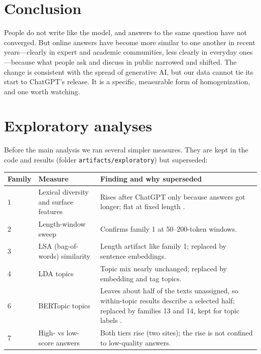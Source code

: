\documentclass[11pt]{article}
\begin{document}
\section{Conclusion}

People do not write like the model, and answers to the same question have not converged. But online
answers have become more similar to one another in recent years---clearly in expert and academic
communities, less clearly in everyday ones---because what people ask and discuss in public narrowed
and shifted. The change is consistent with the spread of generative AI, but our data cannot tie its
start to ChatGPT's release. It is a specific, measurable form of homogenization, and one worth
watching.

\appendix
\section{Exploratory analyses}
\label{app:exploratory}

Before the main analysis we ran several simpler measures. They are kept in the code and results
(folder \texttt{artifacts/\allowbreak exploratory}) but superseded:

\begin{table}[H]
\centering
\small
\begin{tabularx}{\linewidth}{lp{3.2cm}X}
\toprule
Family & Measure & Finding and why superseded \\
\midrule
1 & Lexical diversity and surface features & Rises after ChatGPT only because answers got longer; flat at fixed length \citep{mccarthy2010}. \\
2 & Length-window sweep & Confirms family 1 at 50--200-token windows. \\
3 & LSA (bag-of-words) similarity & Length artifact like family 1; replaced by sentence embeddings. \\
4 & LDA topics & Topic mix nearly unchanged; replaced by embedding and tag topics. \\
6 & BERTopic topics & Leaves about half of the texts unassigned, so within-topic results describe a selected half; replaced by families 13 and 14, kept for topic labels \citep{grootendorst2022}. \\
7 & High- vs low-score answers & Both tiers rise (two sites); the rise is not confined to low-quality answers. \\
\bottomrule
\end{tabularx}
\end{table}



\end{document}
